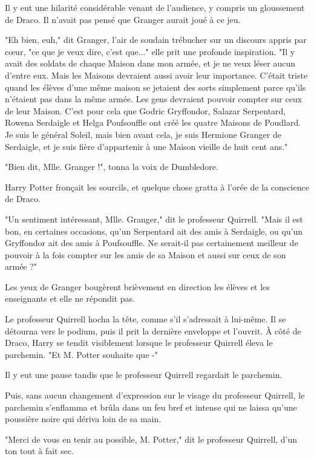 Il y eut une hilarité considérable venant de l'audience, y compris un gloussement de Draco. Il n'avait pas pensé que Granger aurait joué à ce jeu.

"Eh bien, euh," dit Granger, l'air de soudain trébucher sur un discours appris par cœur, "ce que je veux dire, c'est que..." elle prit une profonde inspiration. "Il y avait des soldats de chaque Maison dans mon armée, et je ne veux léser aucun d'entre eux. Mais les Maisons devraient aussi avoir leur importance. C'était triste quand les élèves d'une même maison se jetaient des sorts simplement parce qu'ils n'étaient pas dans la même armée. Les gens devraient pouvoir compter sur ceux de leur Maison. C'est pour cela que Godric Gryffondor, Salazar Serpentard, Rowena Serdaigle et Helga Poufsouffle ont créé les quatre Maisons de Poudlard. Je suis le général Soleil, mais bien avant cela, je suis Hermione Granger de Serdaigle, et je suis fière d'appartenir à une Maison vieille de huit cent ans."

"Bien dit, Mlle. Granger !", tonna la voix de Dumbledore.

Harry Potter fronçait les sourcils, et quelque chose gratta à l'orée de la conscience de Draco.

"Un sentiment intéressant, Mlle. Granger," dit le professeur Quirrell. "Mais il est bon, en certaines occasions, qu'un Serpentard ait des amis à Serdaigle, ou qu'un Gryffondor ait des amis à Poufsouffle. Ne serait-il pas certainement meilleur de pouvoir à la fois compter sur les amis de sa Maison et aussi sur ceux de son armée ?"

Les yeux de Granger bougèrent brièvement en direction les élèves et les enseignants et elle ne répondit pas.

Le professeur Quirrell hocha la tête, comme s'il s'adressait à lui-même. Il se détourna vers le podium, puis il prit la dernière enveloppe et l'ouvrit. À côté de Draco, Harry se tendit visiblement lorsque le professeur Quirrell éleva le parchemin. "Et M. Potter souhaite que -"

Il y eut une pause tandis que le professeur Quirrell regardait le parchemin.

Puis, sans aucun changement d'expression sur le visage du professeur Quirrell, le parchemin s'enflamma et brûla dans un feu bref et intense qui ne laissa qu'une poussière noire qui dériva loin de sa main.

"Merci de vous en tenir au possible, M. Potter," dit le professeur Quirrell, d'un ton tout à fait sec.

